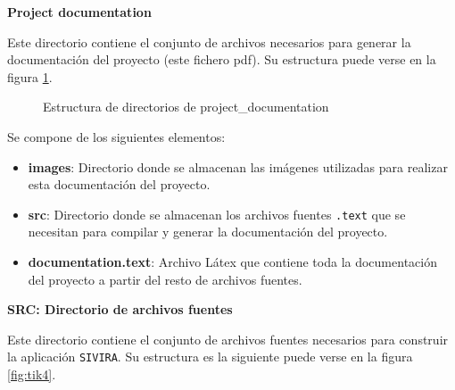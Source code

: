 \newpage

\textbf{Project documentation}

Este directorio contiene el conjunto de archivos necesarios para generar la documentación del proyecto (este fichero pdf). Su estructura puede verse en la figura \ref{fig:tik3}.

\begin{figure}
\centering
{}
\caption{Estructura de directorios de project\_documentation} \label{fig:tik3}
\end{figure}

Se compone de los siguientes elementos:

\vspace{-0.5cm}

\begin{itemize}
\item \textbf{images}: Directorio donde se almacenan las imágenes utilizadas para realizar esta documentación del proyecto.
\item \textbf{src}: Directorio donde se almacenan los archivos fuentes \texttt{.text} que se necesitan para compilar y generar la documentación del proyecto.
\item \textbf{documentation.text}: Archivo Látex que contiene toda la documentación del proyecto a partir del resto de archivos fuentes.
\end{itemize}

\textbf{SRC: Directorio de archivos fuentes}

Este directorio contiene el conjunto de archivos fuentes necesarios para construir la aplicación \texttt{SIVIRA}. Su estructura es la siguiente puede verse en la figura \ref{fig:tik4}.

